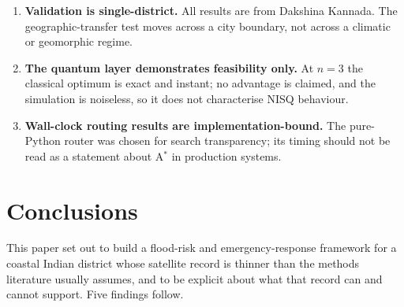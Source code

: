 \documentclass[11pt,a4paper]{article}
\begin{document}
\begin{enumerate}
      contingency metric computed against it inherits this asymmetry.
\item \textbf{Validation is single-district.} All results are from Dakshina
      Kannada. The geographic-transfer test moves across a city boundary, not
      across a climatic or geomorphic regime.
\item \textbf{The quantum layer demonstrates feasibility only.} At $n=3$ the
      classical optimum is exact and instant; no advantage is claimed, and the
      simulation is noiseless, so it does not characterise NISQ behaviour.
\item \textbf{Wall-clock routing results are implementation-bound.} The
      pure-Python router was chosen for search transparency; its timing should
      not be read as a statement about A$^\ast$ in production systems.
\end{enumerate}

\section{Conclusions}
\label{sec:conclusions}

This paper set out to build a flood-risk and emergency-response framework for a
coastal Indian district whose satellite record is thinner than the methods
literature usually assumes, and to be explicit about what that record can and
cannot support. Five findings follow.
\end{document}
